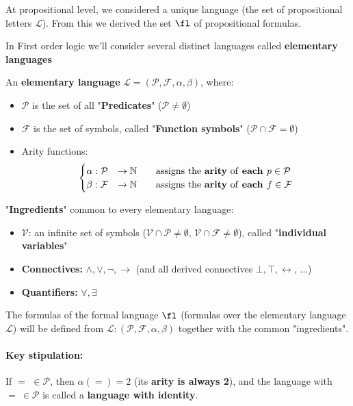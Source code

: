 At propositional level, we considered a unique language (the set of propositional letters $\mathcal{L}$). From this we derived the set $\fl$ of propositional formulas.

In First order logic we'll consider several distinct languages called \textbf{elementary languages}

\begin{definition}
	An \textbf{elementary language} $\mathcal{L} = (\mathcal{P}, \mathcal{F}, \alpha, \beta)$, where:
	\begin{itemize}
		\item $\mathcal{P}$ is the set of all "\textbf{Predicates}" ($\mathcal{P} \neq \emptyset$)
		\item $\mathcal{F}$ is the set of symbols, called "\textbf{Function symbols}" ($\mathcal{P} \cap \mathcal{F} = \emptyset$)
		\item Arity functions:
		$$
		\begin{cases}
			\alpha: \mathcal{P} & \rightarrow \mathbb{N} \qquad \text{assigns the \textbf{arity} of \textbf{each }} p \in \mathcal{P} \\
			\beta: \mathcal{F} & \rightarrow \mathbb{N} \qquad \text{assigns the \textbf{arity} of \textbf{each }} f \in \mathcal{F} \\
		\end{cases}
		$$
	\end{itemize}
\end{definition}

"\textbf{Ingredients}" common to every elementary language:
\begin{itemize}
	\item $\mathcal{V}$: an infinite set of symbols ($\mathcal{V} \cap \mathcal{P} \neq \emptyset$, $\mathcal{V} \cap \mathcal{F} \neq \emptyset$), called "\textbf{individual variables}"
	\item \textbf{Connectives:} $\wedge, \vee, \neg, \rightarrow$ (and all derived connectives $\bot, \top, \leftrightarrow, \, \dots$)
	\item \textbf{Quantifiers:} $\forall, \exists$
\end{itemize}

The formulas of the formal language $\fl$ (formulas over the elementary language $\mathcal{L}$) will be defined from $\mathcal{L}: (\mathcal{P}, \mathcal{F}, \alpha, \beta)$ together with the common "ingredients".

\paragraph{Key stipulation:} If $=$ $\in \mathcal{P}$, then $\alpha(=) = 2$ (its \textbf{arity is always 2}), and the language with $= \ \in \mathcal{P}$ is called a \textbf{language with identity}.

